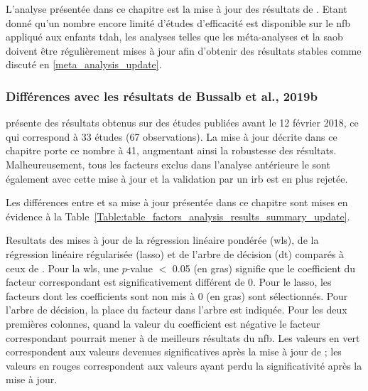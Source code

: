 L'analyse présentée dans ce chapitre est la mise à jour des résultats de \citet{Bussalb2019clinical}. Etant donné qu'un nombre encore limité d'études
d'efficacité est disponible sur le \gls{nfb} appliqué aux enfants \gls{tdah}, les analyses telles que les méta-analyses et la \gls{saob} doivent être régulièrement mises
à jour afin d'obtenir des résultats stables comme discuté en \ref{meta_analysis_update}.

\subsubsection{Différences avec les résultats de Bussalb et al., 2019b}
\citet{Bussalb2019clinical} présente des résultats obtenus sur des études publiées avant le 12 février 2018, ce qui correspond à 33 études (67 observations). La mise 
à jour décrite dans ce chapitre porte ce nombre à 41, augmentant ainsi la robustesse des
résultats. Malheureusement, tous les facteurs exclus dans l'analyse antérieure le sont également avec cette mise à jour et la validation par
un \gls{irb} est en plus rejetée.

Les différences entre \citet{Bussalb2019clinical} et sa mise à jour présentée dans ce chapitre sont mises en évidence à la 
Table~\ref{Table:table_factors_analysis_results_summary_update}.

\begin{table}[h!]
  \centering
  \caption[Comparaison entre les résultats de la \gls{saob} de \citet{Bussalb2019clinical} et de sa mise à jour.]{Resultats des mises à jour de la régression linéaire pondérée (\gls{wls}), de la régression linéaire régularisée (\gls{lasso}) et de l'arbre de décision (\gls{dt})
	comparés à ceux de \citet{Bussalb2019clinical}. Pour la \gls{wls}, une $p$-value $<$ 0.05 
	(en gras) signifie que le coefficient du facteur correspondant est significativement différent de 0. Pour le \gls{lasso}, les facteurs dont les coefficients sont non mis à 0 (en gras) sont 
	sélectionnés. Pour l'arbre de décision, la place du facteur dans l'arbre est indiquée. Pour les deux premières colonnes, quand la valeur du coefficient est négative le facteur 
	correspondant pourrait mener à de meilleurs résultats du \gls{nfb}. Les valeurs en vert correspondent aux valeurs devenues significatives après la mise à jour de \citet{Bussalb2019clinical}; les valeurs
	en rouges correspondent aux valeurs ayant perdu la significativité après la mise à jour.}
  
  \label{Table:table_factors_analysis_results_summary_update}
\end{table}

